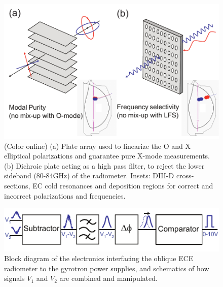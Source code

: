 \documentclass[aps,pra,twocolumn]{revtex4}
\begin{document}
  \begin{figure}[t]
       \includegraphics{fig3.pdf} %
       \caption{\label{FigQO} 
         (Color online) (a) Plate array used to linearize the O and X 
         elliptical polarizations and guarantee pure X-mode measurements. 
         (b) Dichroic plate acting as a high pass filter, to reject the lower
         sideband (80-84GHz) of the radiometer. Insets: DIII-D cross-sections, 
         EC cold resonances and deposition regions for correct and incorrect
         polarizations and frequencies.}
  \end{figure}


\begin{figure}[t]
  \includegraphics{fig4.pdf} %
  \caption{\label{FigBlockElectr} 
    Block diagram of the electronics interfacing the oblique ECE radiometer 
    to the gyrotron power supplies, and schematics of how signals $V_1$ and 
    $V_2$ are combined and manipulated.}
\end{figure}
\end{document}
